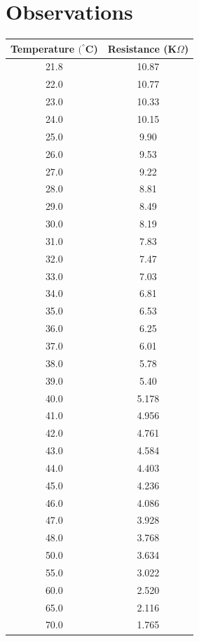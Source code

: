 \documentclass[%
 sor,
 jor,
 amsmath,amssymb,
 reprint,%
]{revtex4-2}
\begin{document}
\section{Observations}
\begin{table}[ht]
\begin{minipage}{0.48\textwidth}
\centering
    \begin{tabular}{|c|c|}
        \hline
        Temperature $(^\circ$C) & Resistance (K$\Omega$) \\ 
        \hline
        21.8 & 10.87 \\ 
        22.0 & 10.77 \\ 
        23.0 & 10.33 \\ 
        24.0 & 10.15 \\ 
        25.0 & 9.90 \\ 
        26.0 & 9.53 \\ 
        27.0 & 9.22 \\ 
        28.0 & 8.81 \\ 
        29.0 & 8.49 \\ 
        30.0 & 8.19 \\ 
        31.0 & 7.83 \\ 
        32.0 & 7.47 \\ 
        33.0 & 7.03 \\ 
        34.0 & 6.81 \\ 
        35.0 & 6.53 \\ 
        36.0 & 6.25 \\ 
        37.0 & 6.01 \\ 
        38.0 & 5.78 \\ 
        39.0 & 5.40 \\ 
        40.0 & 5.178 \\ 
        41.0 & 4.956 \\ 
        42.0 & 4.761 \\ 
        43.0 & 4.584 \\ 
        44.0 & 4.403 \\ 
        45.0 & 4.236 \\ 
        46.0 & 4.086 \\ 
        47.0 & 3.928 \\ 
        48.0 & 3.768 \\ 
        50.0 & 3.634 \\ 
        55.0 & 3.022 \\ 
        60.0 & 2.520 \\ 
        65.0 & 2.116 \\ 
        70.0 & 1.765 \\ 

\end{tabular}
\end{minipage}
\end{table}
\end{document}
